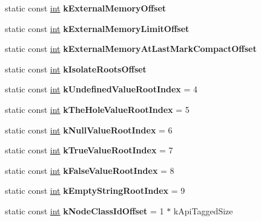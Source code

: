 \begin{DoxyCompactItemize}
\item 
static const \mbox{\hyperlink{classint}{int}} {\bfseries k\+External\+Memory\+Offset}
\item 
static const \mbox{\hyperlink{classint}{int}} {\bfseries k\+External\+Memory\+Limit\+Offset}
\item 
static const \mbox{\hyperlink{classint}{int}} {\bfseries k\+External\+Memory\+At\+Last\+Mark\+Compact\+Offset}
\item 
static const \mbox{\hyperlink{classint}{int}} {\bfseries k\+Isolate\+Roots\+Offset}
\item 
\mbox{\label{classv8_1_1internal_1_1Internals_a7281ff0eafed559e64613465b1a03296}} 
static const \mbox{\hyperlink{classint}{int}} {\bfseries k\+Undefined\+Value\+Root\+Index} = 4
\item 
\mbox{\label{classv8_1_1internal_1_1Internals_ac07a35d3efef0c107062b3eb88696e31}} 
static const \mbox{\hyperlink{classint}{int}} {\bfseries k\+The\+Hole\+Value\+Root\+Index} = 5
\item 
\mbox{\label{classv8_1_1internal_1_1Internals_ab311cf753ec5c968052bd83ef21e83f8}} 
static const \mbox{\hyperlink{classint}{int}} {\bfseries k\+Null\+Value\+Root\+Index} = 6
\item 
\mbox{\label{classv8_1_1internal_1_1Internals_a93abd58b178eca469bade28e68b5c59e}} 
static const \mbox{\hyperlink{classint}{int}} {\bfseries k\+True\+Value\+Root\+Index} = 7
\item 
\mbox{\label{classv8_1_1internal_1_1Internals_a90b6837aa368bbe4ffd914e6f753b167}} 
static const \mbox{\hyperlink{classint}{int}} {\bfseries k\+False\+Value\+Root\+Index} = 8
\item 
\mbox{\label{classv8_1_1internal_1_1Internals_a6f669f3d98fe653b281b26be3bc0655a}} 
static const \mbox{\hyperlink{classint}{int}} {\bfseries k\+Empty\+String\+Root\+Index} = 9
\item 
\mbox{\label{classv8_1_1internal_1_1Internals_af4fb6d499cb87f03031ad4d6be6bcd8f}} 
static const \mbox{\hyperlink{classint}{int}} {\bfseries k\+Node\+Class\+Id\+Offset} = 1 $\ast$ k\+Api\+Tagged\+Size

\end{DoxyCompactItemize}
